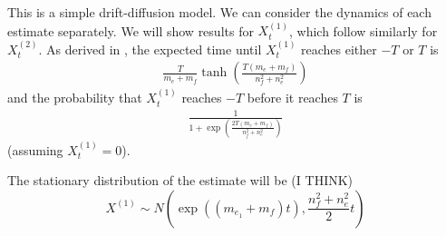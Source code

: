 \documentclass{article}
\begin{document}
This is a simple drift-diffusion model.  We can consider the dynamics of each estimate separately.  We will show results for $X_t^{(1)}$, which follow similarly for $X_t^{(2)}$.  As derived in \cite{Bogacz:2006uq}, the expected time until $X_t^{(1)}$ reaches either $-T$ or $T$ is 
\begin{align*}
\frac{T}{m_e+m_f}\tanh\left(\frac{T(m_e+m_f)}{n_f^2+n_e^2}\right)
\end{align*}
and the probability that $X_t^{(1)}$ reaches $-T$ before it reaches $T$ is
\begin{align*}
\frac{1}{1+\exp\left(\frac{2T(m_e+m_f)}{n_f^2+n_e^2}\right)}
\end{align*}
(assuming $X_t^{(1)}=0$).

The stationary distribution of the estimate will be  (I THINK)
\begin{equation}
X^{(1)}\sim N(\exp((m_{e_1}+m_f)t),\frac{n_f^2+n_e^2}{2}t) \label{ddm_stat}
\end{equation} 
\end{document}
